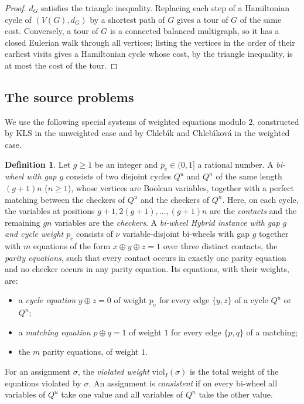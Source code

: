 \documentclass[11pt]{amsart}
\theoremstyle{definition}
\newtheorem{definition}[theorem]{Definition}
\theoremstyle{remark}
\numberwithin{equation}{section}
\newcommand{\viol}{\mathrm{viol}}
\newcommand{\pc}{p_{\mathrm{c}}}
\begin{document}
\begin{proof}
$d_G$ satisfies the triangle inequality. Replacing each step of a Hamiltonian cycle of $(V(G),d_G)$ by a shortest path of $G$ gives a tour of $G$ of the same cost. Conversely, a tour of $G$ is a connected balanced multigraph, so it has a closed Eulerian walk through all vertices; listing the vertices in the order of their earliest visits gives a Hamiltonian cycle whose cost, by the triangle inequality, is at most the cost of the tour.
\end{proof}

\subsection{The source problems}\label{sec:source}
We use the following special systems of weighted equations modulo $2$, constructed by KLS \cite[\S4]{KLS15} in the unweighted case and by Chleb\'{\i}k and Chleb\'{\i}kov\'a \cite[\S\S2--3]{CC22} in the weighted case.

\begin{definition}\label{def:hybrid}
Let $g\ge1$ be an integer and $\pc\in(0,1]$ a rational number. A \emph{bi-wheel with gap $g$} consists of two disjoint cycles $Q^u$ and $Q^n$ of the same length $(g+1)n$ ($n\ge1$), whose vertices are Boolean variables, together with a perfect matching between the checkers of $Q^u$ and the checkers of $Q^n$. Here, on each cycle, the variables at positions $g+1,2(g+1),\dots,(g+1)n$ are the \emph{contacts} and the remaining $gn$ variables are the \emph{checkers}. A \emph{bi-wheel Hybrid instance with gap $g$ and cycle weight $\pc$} consists of $\nu$ variable-disjoint bi-wheels with gap $g$ together with $m$ equations of the form $x\oplus y\oplus z=1$ over three distinct contacts, the \emph{parity equations}, such that every contact occurs in exactly one parity equation and no checker occurs in any parity equation. Its equations, with their weights, are:
\begin{itemize}[leftmargin=2em]
\item a \emph{cycle equation} $y\oplus z=0$ of weight $\pc$ for every edge $\{y,z\}$ of a cycle $Q^u$ or $Q^n$;
\item a \emph{matching equation} $p\oplus q=1$ of weight $1$ for every edge $\{p,q\}$ of a matching;
\item the $m$ parity equations, of weight $1$.
\end{itemize}
For an assignment $\sigma$, the \emph{violated weight} $\viol_I(\sigma)$ is the total weight of the equations violated by $\sigma$. An assignment is \emph{consistent} if on every bi-wheel all variables of $Q^u$ take one value and all variables of $Q^n$ take the other value.
\end{definition}
\end{document}
